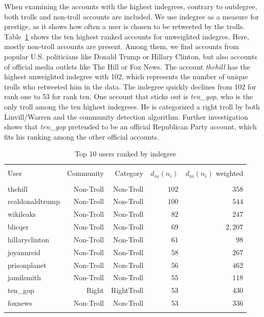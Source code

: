 \documentclass[12pt, titlepage=true, toc=bib]{scrartcl}
\begin{document}
When examining the accounts with the highest indegrees, contrary to outdegree, both trolls and non-troll accounts are included. We use indegree as a measure for prestige, as it shows how often a user is chosen to be retweeted by the trolls. Table~\ref{tab:in} shows the ten highest ranked accounts for unweighted indegree. Here, mostly non-troll accounts are present. Among them, we find  accounts from popular U.S. politicians like Donald Trump or Hillary Clinton, but also accounts of official media outlets like The Hill or Fox News. The account \textit{thehill} has the highest unweighted indegree with 102, which represents the number of unique trolls who retweeted him in the data. The indegree quickly declines from 102 for rank one to 53 for rank ten. One account that sticks out is \textit{ten\_gop}, who is the only troll among the ten highest indegrees. He is categorized a right troll by both Linvill/Warren \cite*{linvill_troll_2018} and the community detection algorithm. Further investigation shows that \textit{ten\_gop} pretended to be an official Republican Party account, which fits his ranking among the other official accounts. %

\begin{table}[ht] \centering 
  \begin{tabular*}{.95\linewidth}{@{\extracolsep{\fill}} lrrrr} 
\\[-1.8ex]\hline 
\hline \\[-1.8ex] 
User & Community & Category & \( d_{in}(n_{i}) \) & \( d_{in}(n_{i}) \) weighted \\ 
\hline \\[-1.8ex] 
thehill & Non-Troll & Non-Troll & $102$ & $358$ \\ 
realdonaldtrump & Non-Troll & Non-Troll & $100$ & $544$ \\ 
wikileaks & Non-Troll & Non-Troll & $82$ & $247$ \\ 
blicqer & Non-Troll & Non-Troll & $69$ & $2,207$ \\ 
hillaryclinton & Non-Troll & Non-Troll & $61$ & $98$ \\ 
joyannreid & Non-Troll & Non-Troll & $58$ & $267$ \\ 
prisonplanet & Non-Troll & Non-Troll & $56$ & $462$ \\ 
jamilsmith & Non-Troll & Non-Troll & $55$ & $118$ \\ 
ten\_gop & Right & RightTroll & $53$ & $430$ \\ 
foxnews & Non-Troll & Non-Troll & $53$ & $336$ \\ 
\hline \\[-1.8ex] 
\end{tabular*} 
\caption{Top 10 users ranked by indegree} 
  \label{tab:in} 
\end{table} 
\end{document}

